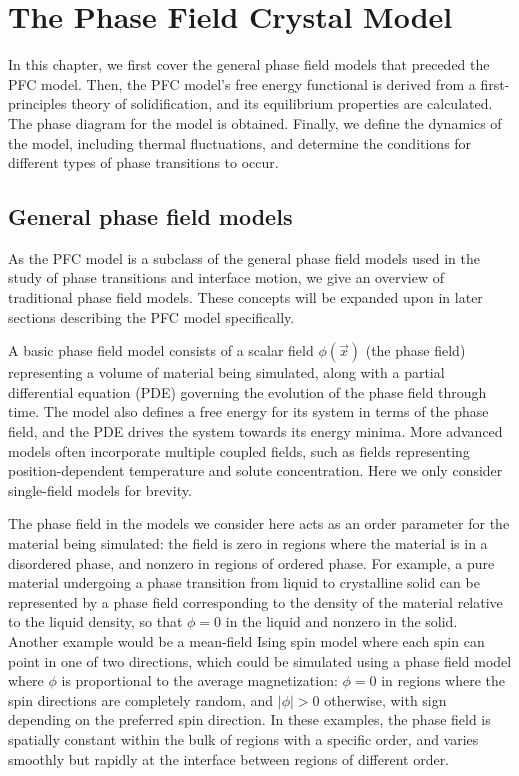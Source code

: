 
\chapter{\sf The Phase Field Crystal Model}\label{ch:pfc}

In this chapter, we first cover the general phase field models that preceded the PFC model. Then, the PFC model's free energy functional is derived from a first-principles theory of solidification, and its equilibrium properties are calculated. The phase diagram for the model is obtained. Finally, we define the dynamics of the model, including thermal fluctuations, and determine the conditions for different types of phase transitions to occur.


\section{General phase field models}\label{sec:pfc_phasefield}

As the PFC model is a subclass of the general phase field models used in the study of phase transitions and interface motion, we give an overview of traditional phase field models. These concepts will be expanded upon in later sections describing the PFC model specifically.

A basic phase field model consists of a scalar field $\phi(\vec{x})$ (the phase field) representing a volume of material being simulated, along with a partial differential equation (PDE) governing the evolution of the phase field through time. The model also defines a free energy for its system in terms of the phase field, and the PDE drives the system towards its energy minima. More advanced models often incorporate multiple coupled fields, such as fields representing position-dependent temperature and solute concentration. Here we only consider single-field models for brevity.

The phase field in the models we consider here acts as an order parameter for the material being simulated: the field is zero in regions where the material is in a disordered phase, and nonzero in regions of ordered phase. For example, a pure material undergoing a phase transition from liquid to crystalline solid can be represented by a phase field corresponding to the density of the material relative to the liquid density, so that $\phi=0$ in the liquid and nonzero in the solid. Another example would be a mean-field Ising spin model where each spin can point in one of two directions, which could be simulated using a phase field model where $\phi$ is proportional to the average magnetization: $\phi=0$ in regions where the spin directions are completely random, and $|\phi|>0$ otherwise, with sign depending on the preferred spin direction. In these examples, the phase field is spatially constant within the bulk of regions with a specific order, and varies smoothly but rapidly at the interface between regions of different order.


